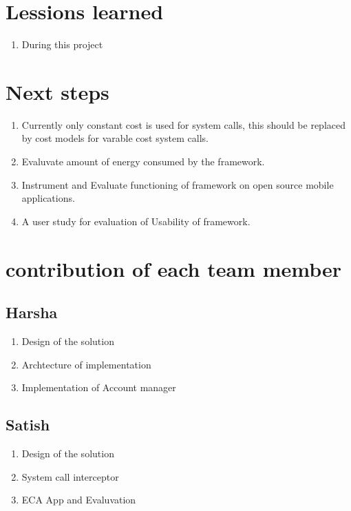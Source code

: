 \section{Lessions learned}

\begin{enumerate}

\item During this project 

\end{enumerate}

\section{Next steps}

\begin{enumerate}

\item Currently only constant cost is used for system calls, this should be replaced by cost models for varable cost system calls.
\item Evaluvate amount of energy consumed by the framework.
\item Instrument and Evaluate functioning of framework on open source mobile applications.
\item A user study for evaluation of Usability of framework. 

\end{enumerate}

\section{contribution of each team member}

\subsection{Harsha}

\begin{enumerate}
\item Design of the solution 
\item Archtecture of implementation
\item Implementation of Account manager
\end{enumerate}

\subsection{Satish}
\begin{enumerate}
\item Design of the solution
\item System call interceptor
\item ECA App and Evaluvation
\end{enumerate}


